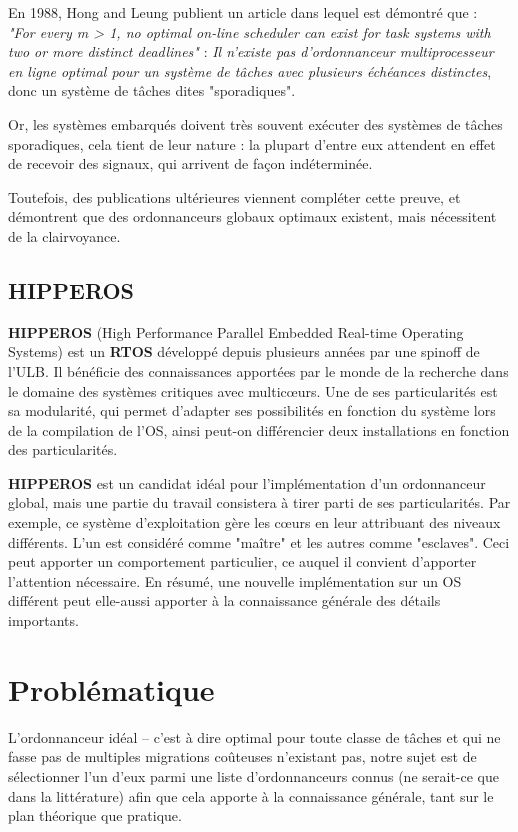 \documentclass[11pt,a4paper,oneside]{report}
\begin{document}
En 1988, Hong and Leung \cite{hong_-line_1988} publient un article dans lequel est 
démontré que : \\
\textit{"For every m > 1, no optimal on-line scheduler can exist for task systems with two or more distinct deadlines"} : 
\textit{Il n'existe pas d'ordonnanceur multiprocesseur en ligne optimal pour un système de tâches 
avec plusieurs échéances distinctes}, donc un système de tâches dites "sporadiques".

Or, les systèmes embarqués doivent très souvent exécuter des systèmes de tâches sporadiques, 
cela tient de leur nature : la plupart d'entre eux attendent en effet de recevoir des 
signaux, qui arrivent de façon indéterminée.

Toutefois, des publications ultérieures viennent compléter cette preuve, et démontrent 
que des ordonnanceurs globaux optimaux existent, mais nécessitent de la clairvoyance.




\subsection{HIPPEROS}
\textbf{HIPPEROS} (High Performance Parallel Embedded Real-time Operating Systems)
est un \textbf{RTOS} développé depuis plusieurs années par une spinoff de l'ULB.
Il bénéficie des connaissances apportées par le monde de la recherche dans 
le domaine des systèmes critiques avec multic\oe{}urs. Une de ses particularités 
est sa modularité, qui permet d'adapter ses possibilités en fonction du système 
lors de la compilation de l'OS, ainsi peut-on différencier deux installations 
en fonction des particularités.

\textbf{HIPPEROS} est un candidat idéal pour l'implémentation d'un ordonnanceur 
global, mais une partie du travail consistera à tirer parti de ses particularités. 
Par exemple, ce système d'exploitation gère les c\oe{}urs en leur attribuant des 
niveaux différents. L'un est considéré comme "maître" et les autres comme "esclaves". 
Ceci peut apporter un comportement particulier, ce auquel il convient d'apporter 
l'attention nécessaire. En résumé, une nouvelle implémentation sur un OS différent 
peut elle-aussi apporter à la connaissance générale des détails importants.


\section{Problématique}
L'ordonnanceur idéal -- c'est à dire optimal pour toute classe de tâches et 
qui ne fasse pas de multiples migrations coûteuses n'existant pas, 
notre sujet est de sélectionner l'un d'eux parmi une liste 
d'ordonnanceurs connus (ne serait-ce que dans la littérature) afin que cela apporte 
à la connaissance générale, tant sur le plan théorique que pratique.
\end{document}
